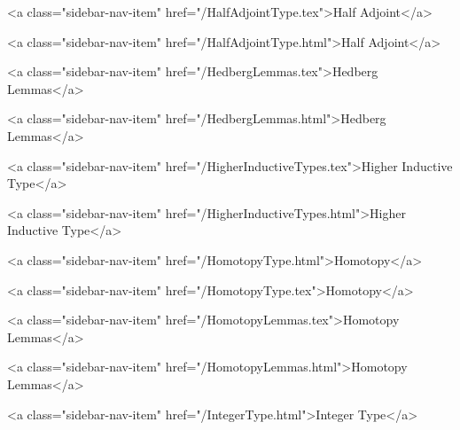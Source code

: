       
        
          <a class="sidebar-nav-item" href="/HalfAdjointType.tex">Half Adjoint</a>
        
      
    
      
        
          <a class="sidebar-nav-item" href="/HalfAdjointType.html">Half Adjoint</a>
        
      
    
      
        
          <a class="sidebar-nav-item" href="/HedbergLemmas.tex">Hedberg Lemmas</a>
        
      
    
      
        
          <a class="sidebar-nav-item" href="/HedbergLemmas.html">Hedberg Lemmas</a>
        
      
    
      
        
          <a class="sidebar-nav-item" href="/HigherInductiveTypes.tex">Higher Inductive Type</a>
        
      
    
      
        
          <a class="sidebar-nav-item" href="/HigherInductiveTypes.html">Higher Inductive Type</a>
        
      
    
      
        
          <a class="sidebar-nav-item" href="/HomotopyType.html">Homotopy</a>
        
      
    
      
        
          <a class="sidebar-nav-item" href="/HomotopyType.tex">Homotopy</a>
        
      
    
      
        
          <a class="sidebar-nav-item" href="/HomotopyLemmas.tex">Homotopy Lemmas</a>
        
      
    
      
        
          <a class="sidebar-nav-item" href="/HomotopyLemmas.html">Homotopy Lemmas</a>
        
      
    
      
        
          <a class="sidebar-nav-item" href="/IntegerType.html">Integer Type</a>
        

